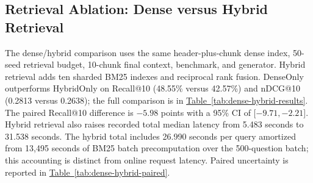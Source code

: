 \begin{table}[t]
\centering
\scriptsize
\caption{Embedding-text ablation on 400 paired answerable questions. Values
are percentages. Document and provision success denote retrieval of at least one
chunk from a gold document or gold provision, respectively. Deltas are
chunk+metadata minus chunk-only. Recall@10 values in the two rows both round
to 48.5\%; the unrounded difference is +0.08 pp.}
\label{tab:embedding-results}
\end{table}

\subsection{Retrieval Ablation: Dense versus Hybrid Retrieval}
\label{sec:ablation-retrieval}

The dense/hybrid comparison uses the same header-plus-chunk dense index,
50-seed retrieval budget, 10-chunk final context, benchmark, and generator.
Hybrid retrieval adds ten sharded BM25 indexes and reciprocal rank fusion.
DenseOnly outperforms
HybridOnly on Recall@10 (48.55\% versus 42.57\%) and nDCG@10 (0.2813 versus
0.2638); the full comparison is in
\hyperref[tab:dense-hybrid-results]{Table~\ref*{tab:dense-hybrid-results}}.
The paired Recall@10 difference is $-5.98$ points with a 95\% CI of
[$-9.71,-2.21$]. Hybrid retrieval also raises recorded total median latency
from 5.483 seconds to 31.538 seconds. The hybrid total includes 26.990 seconds
per query amortized from 13,495 seconds of BM25 batch precomputation over the
500-question batch; this accounting is distinct from online request latency.
Paired uncertainty is reported in
\hyperref[tab:dense-hybrid-paired]{Table~\ref*{tab:dense-hybrid-paired}}.

